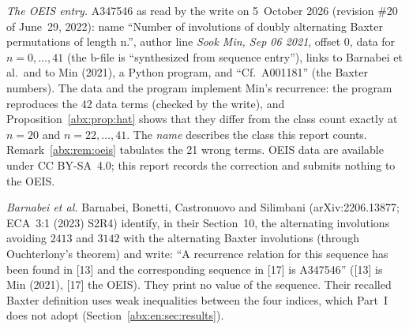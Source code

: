 \documentclass[11pt,letterpaper]{article}
\numberwithin{equation}{section}
\theoremstyle{remark}\newtheorem{remark}[theorem]{Remark}
\begin{document}
\emph{The OEIS entry.} A347546 as read by the write on 5~October 2026 (revision \#20 of June~29, 2022): name ``Number of involutions of doubly alternating Baxter permutations of length n.'', author line \emph{Sook Min, Sep 06 2021}, offset $0$, data for $n=0,\ldots,41$ (the b-file is ``synthesized from sequence entry''), links to Barnabei et al.\ and to Min (2021), a Python program, and ``Cf.\ A001181'' (the Baxter numbers). The data and the program implement Min's recurrence: the program reproduces the 42 data terms (checked by the write), and Proposition~\ref{abx:prop:hat} shows that they differ from the class count exactly at $n=20$ and $n=22,\ldots,41$. The \emph{name} describes the class this report counts. Remark~\ref{abx:rem:oeis} tabulates the 21 wrong terms. OEIS data are available under CC BY-SA~4.0; this report records the correction and submits nothing to the OEIS.

\emph{Barnabei et al.} Barnabei, Bonetti, Castronuovo and Silimbani \cite{barnabei} (arXiv:2206.13877; ECA~3:1 (2023) S2R4) identify, in their Section~10, the alternating involutions avoiding $2413$ and $3142$ with the alternating Baxter involutions (through Ouchterlony's theorem) and write: ``A recurrence relation for this sequence has been found in [13] and the corresponding sequence in [17] is A347546'' ([13] is Min (2021), [17] the OEIS). They print no value of the sequence. Their recalled Baxter definition uses weak inequalities between the four indices, which Part~I does not adopt (Section~\ref{abx:en:sec:results}).
\end{document}
